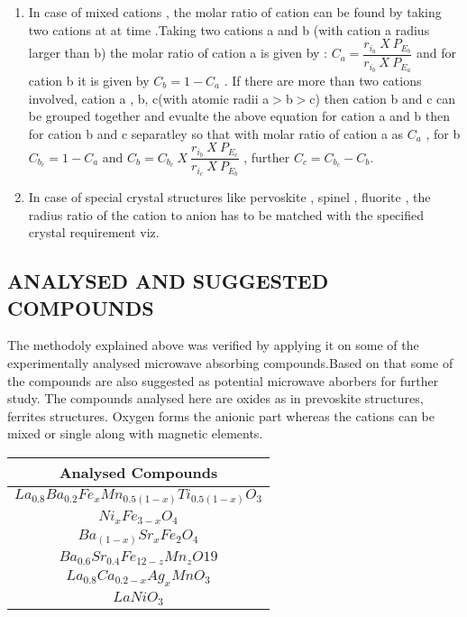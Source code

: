 \documentclass[journal]{IEEEtran}
\begin{document}
\begin{multicols}{2}
\begin{enumerate}
\item{In case of mixed cations , the molar ratio of cation can be found by taking two cations at at time .Taking two cations a and b (with cation a radius larger than b) the molar ratio of cation a is given by :
	\normalsize{
${C_a} = \dfrac{r_{i_a} \ X \ P_{E_b} }{r_{i_b}\ X \ P_{E_a} }$ } and for cation b it is given by $C_b= 1 - C_a$ . If there are more than two cations involved, cation a , b, c(with atomic radii a$>$b$>$c) then cation b and c can be grouped together and evualte the above equation for cation a and b then for cation b and c separatley so that with molar ratio of cation a as $C_a$ , for b \Large{$C_{b_c}= 1-C_a$ and $C_b= C_{b_c} \ X \  \dfrac{r_{i_b} \ X \ P_{E_c} }{r_{i_c} \ X \ P_{E_b} }$ , further $C_c = C_{b_c} - C_b$.}}
	\item{In case of special crystal structures like pervoskite , spinel , fluorite , the radius ratio of the cation to anion has to be matched with the specified crystal requirement viz. }
\end{enumerate}
\subsection{ANALYSED AND SUGGESTED COMPOUNDS}
The methodoly explained above was verified by applying it  on some of the experimentally analysed microwave absorbing compounds.Based on that some of the compounds are also suggested as potential microwave aborbers for further study.
The compounds analysed here are oxides as in prevoskite structures, ferrites structures. Oxygen forms the anionic part whereas the cations can be mixed or single along with magnetic elements.


	\begin{tabular}{|c|}
	\hline
\textbf{	Analysed Compounds}  \\
\hline
	$La_0.8Ba_0.2Fe_xMn_{0.5(1-x)}Ti_{0.5(1-x)}O_3$ \cite{Adi}\\
	\hline
	$Ni_xFe_{3-x}O_4$ \cite{yunas2017magnetic} \\
	\hline
	$Ba_{(1-x)}Sr_xFe_2O_4$ \cite{Shukla} \\
	\hline
	$Ba_0.6Sr_0.4Fe_{12-z}Mn_zO19$ \cite{Adi} \\
	\hline
	$La_0.8Ca_{0.2-x}Ag_xMnO_3$ \cite{LaMn} \\
	\hline
	$LaNiO_3$ \cite{LNO}\\
	\hline
	

\end{tabular}
\end{multicols}
\end{document}
